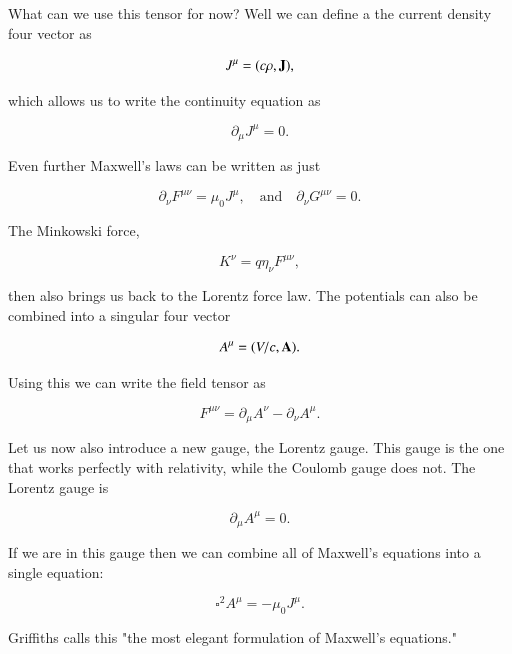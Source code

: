 \documentclass[preprint, review,12pt]{elsarticle}
\def\b{\textbf}
\def\and{\quad \text{and} \quad}
\begin{document}
What can we use this tensor for now? Well we can define a the current density four vector as 

\begin{equation}
    J^\mu = (c\rho, \b J),
\end{equation}

which allows us to write the continuity equation as 

\begin{equation}
    \partial_\mu J^\mu = 0.
\end{equation}

Even further Maxwell's laws can be written as just 

\begin{equation}
    \partial_\nu F^{\mu\nu} = \mu_0 J^\mu, \and \partial_\nu G^{\mu\nu} = 0.
\end{equation}

The Minkowski force,

\begin{equation}
    K^\nu = q\eta_\nu F^{\mu\nu},
\end{equation}

then also brings us back to the Lorentz force law. The potentials can also be combined into a singular four vector

\begin{equation}
    A^\mu = (V/c, \b A).
\end{equation}

Using this we can write the field tensor as 

\begin{equation}
    F^{\mu\nu} = \partial_\mu A^\nu - \partial_\nu A^\mu.
\end{equation}

Let us now also introduce a new gauge, the Lorentz gauge. This gauge is the one that works perfectly with relativity, while the Coulomb gauge does not. The Lorentz gauge is 

\begin{equation}
    \partial_\mu A^\mu = 0.
\end{equation}

If we are in this gauge then we can combine all of Maxwell's equations into a single equation:

\begin{equation}
    \square^2 A^\mu = - \mu_0 J^\mu.
\end{equation}

Griffiths calls this "the most elegant formulation of Maxwell's equations."
\end{document}
